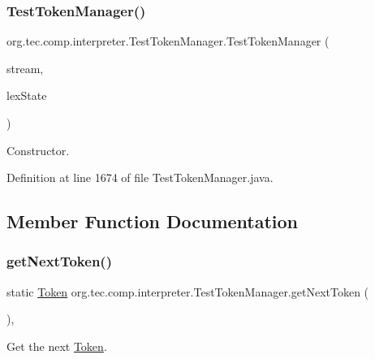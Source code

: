 \subsubsection{\texorpdfstring{Test\+Token\+Manager()}{TestTokenManager()}\hspace{0.1cm}{\footnotesize\ttfamily [2/2]}}
{\footnotesize\ttfamily org.\+tec.\+comp.\+interpreter.\+Test\+Token\+Manager.\+Test\+Token\+Manager (\begin{DoxyParamCaption}\item[{\mbox{\hyperlink{classorg_1_1tec_1_1comp_1_1interpreter_1_1_simple_char_stream}{Simple\+Char\+Stream}}}]{stream,  }\item[{int}]{lex\+State }\end{DoxyParamCaption})\hspace{0.3cm}{\ttfamily [inline]}}

Constructor. 

Definition at line 1674 of file Test\+Token\+Manager.\+java.



\subsection{Member Function Documentation}
\mbox{\label{classorg_1_1tec_1_1comp_1_1interpreter_1_1_test_token_manager_ac7a6bdcbdc59bf06afd198078ba856b7}} 
\subsubsection{\texorpdfstring{get\+Next\+Token()}{getNextToken()}}
{\footnotesize\ttfamily static \mbox{\hyperlink{classorg_1_1tec_1_1comp_1_1interpreter_1_1_token}{Token}} org.\+tec.\+comp.\+interpreter.\+Test\+Token\+Manager.\+get\+Next\+Token (\begin{DoxyParamCaption}{ }\end{DoxyParamCaption})\hspace{0.3cm}{\ttfamily [inline]}, {\ttfamily [static]}}

Get the next \mbox{\hyperlink{classorg_1_1tec_1_1comp_1_1interpreter_1_1_token}{Token}}. 

